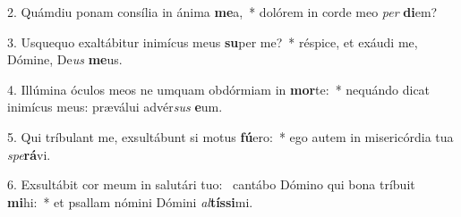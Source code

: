 2. Quámdiu ponam consília in ánima \textbf{me}a,~*  dolórem in corde meo \textit{per} \textbf{di}em?\

3. Usquequo exaltábitur inimícus meus \textbf{su}per me?~*  réspice, et exáudi me, Dómine, De\textit{us} \textbf{me}us.\

4. Illúmina óculos meos ne umquam obdórmiam in \textbf{mor}te:~*  nequándo dicat inimícus meus: præválui advér\textit{sus} \textbf{e}um.\

5. Qui tríbulant me, exsultábunt si motus \textbf{fú}ero:~*  ego autem in misericórdia tua \textit{spe}\textbf{rá}vi.\

6. Exsultábit cor meum in salutári tuo: \dag\  cantábo Dómino qui bona tríbuit \textbf{mi}hi:~*  et psallam nómini Dómini \textit{al}\textbf{tís}\textbf{si}mi.\

